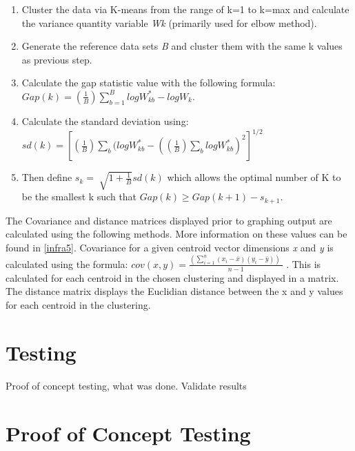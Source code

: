 \begin{enumerate}

\item Cluster the data via K-means from the range of k=1 to k=max and calculate the variance quantity variable \textit{Wk} (primarily used for elbow method).
\item Generate the reference data sets \textit{B} and cluster them with the same k values as previous step. 
\item Calculate the gap statistic value with the following formula: \linebreak
$Gap\left( k \right) = \left( {\frac{1}{B}} \right)\mathop \sum \limits_{b = 1}^B logW_{kb}^* - log{W_k}.$
\item Calculate the standard deviation using: \linebreak
$sd\left( k \right) = {\left[ {\left( {\frac{1}{B}} \right)\mathop \sum \limits_b (logW_{kb}^* - {{(\left( {\frac{1}{B}} \right)\mathop \sum \limits_b logW_{kb}^*)}^2}} \right]^{1/2}}$
\item Then define ${s_k} = \;\sqrt {1 + \frac{1}{B}} sd\left( k \right)$ which allows the optimal number of K to be the smallest k such that $Gap\left( k \right) \ge Gap\left( {k + 1} \right) - {s_{k + 1}}$. 

\end{enumerate}

The Covariance and distance matrices displayed prior to graphing output are calculated using the following methods. More information on these values can be found in \ref{infra5}.
Covariance for a given centroid vector dimensions \textit{x} and \textit{y} is calculated using the formula: $cov\left( {x,y} \right) = \frac{{(\mathop \sum \nolimits_{i = 1}^n \left( {{x_i} - \bar x} \right)\left( {{y_i} - \bar y} \right))\;}}{{n - 1}}$ . This is calculated for each centroid in the chosen clustering and displayed in a matrix.
The distance matrix displays the Euclidian distance between the x and y values for each centroid in the clustering.

\section{Testing}
\label{testing}

\paragraph{}

Proof of concept testing, what was done. Validate results


\section{Proof of Concept Testing}
\label{poc}


